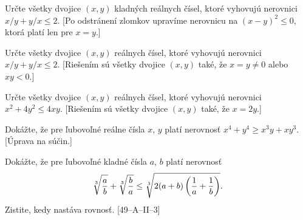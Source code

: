 {
Určte všetky dvojice $(x, y)$ kladných reálnych čísel, ktoré vyhovujú
nerovnici $x/y + y/x \le 2$. [Po odstránení zlomkov upravíme nerovnicu
na $(x-y)^2 \le 0$, ktorá platí len pre $x = y$.]

Určte všetky dvojice $(x, y)$ reálnych čísel, ktoré vyhovujú nerovnici
$x/y + y/x \le 2$. [Riešením sú všetky dvojice $(x, y)$ také, že
$x = y \ne 0$ alebo $xy < 0$.]

Určte všetky dvojice $(x, y)$ reálnych čísel, ktoré vyhovujú nerovnici
$x^2 +4 y^2 \le 4xy$. [Riešením sú všetky dvojice $(x, y)$ také, že
$x = 2y$.]

Dokážte, že pre ľubovoľné reálne čísla $x$, $y$ platí nerovnosť
$x^4 + y^4 \ge x^3y + xy^3$. [Úprava na súčin.]

\D
Dokážte, že pre ľubovoľné kladné čísla $a$, $b$ platí nerovnosť
$$
\root{3}\of{\frac{{\vphantom b}a}b}+\root{3}\of{\frac ba}
\le\root{3}\of{2(a+b)\left(\frac 1a+\frac 1b\right)}.
$$
Zistite, kedy nastáva rovnosť.  [49--A--II--3]
}

